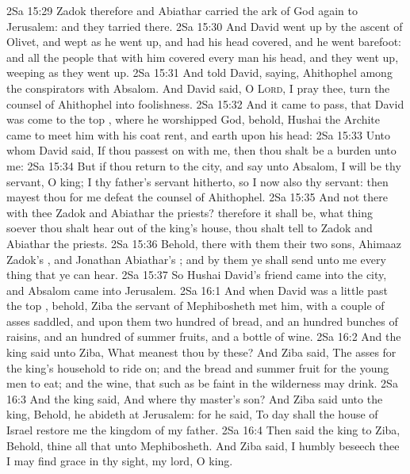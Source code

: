 \vs 2Sa 15:29 Zadok therefore and Abiathar carried the ark of God again to Jerusalem: and they tarried there.
\vs 2Sa 15:30 And David went up by the ascent of  Olivet, and wept as he went up, and had his head covered, and he went barefoot: and all the people that  with him covered every man his head, and they went up, weeping as they went up.
\vs 2Sa 15:31 And  told David, saying, Ahithophel  among the conspirators with Absalom. And David said, O \textsc{Lord}, I pray thee, turn the counsel of Ahithophel into foolishness.
\vs 2Sa 15:32 And it came to pass, that  David was come to the top , where he worshipped God, behold, Hushai the Archite came to meet him with his coat rent, and earth upon his head:
\vs 2Sa 15:33 Unto whom David said, If thou passest on with me, then thou shalt be a burden unto me:
\vs 2Sa 15:34 But if thou return to the city, and say unto Absalom, I will be thy servant, O king;  I  thy father's servant hitherto, so  I now also  thy servant: then mayest thou for me defeat the counsel of Ahithophel.
\vs 2Sa 15:35 And  not there with thee Zadok and Abiathar the priests? therefore it shall be,  what thing soever thou shalt hear out of the king's house, thou shalt tell  to Zadok and Abiathar the priests.
\vs 2Sa 15:36 Behold,  there with them their two sons, Ahimaaz Zadok's , and Jonathan Abiathar's ; and by them ye shall send unto me every thing that ye can hear.
\vs 2Sa 15:37 So Hushai David's friend came into the city, and Absalom came into Jerusalem.
\vs 2Sa 16:1 And when David was a little past the top , behold, Ziba the servant of Mephibosheth met him, with a couple of asses saddled, and upon them two hundred  of bread, and an hundred bunches of raisins, and an hundred of summer fruits, and a bottle of wine.
\vs 2Sa 16:2 And the king said unto Ziba, What meanest thou by these? And Ziba said, The asses  for the king's household to ride on; and the bread and summer fruit for the young men to eat; and the wine, that such as be faint in the wilderness may drink.
\vs 2Sa 16:3 And the king said, And where  thy master's son? And Ziba said unto the king, Behold, he abideth at Jerusalem: for he said, To day shall the house of Israel restore me the kingdom of my father.
\vs 2Sa 16:4 Then said the king to Ziba, Behold, thine  all that  unto Mephibosheth. And Ziba said, I humbly beseech thee  I may find grace in thy sight, my lord, O king.
